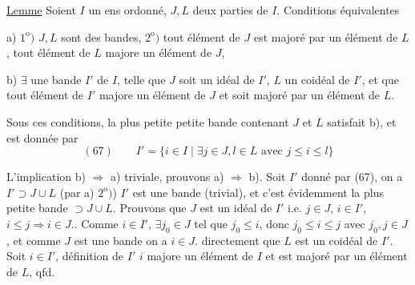 
\uline{Lemme} Soient $I$ un ens ordonné, $J,L$ deux parties de $I$. Conditions équivalentes

a) $1^{\mathrm o})$ $J,L$ sont des bandes, $2^{\mathrm o})$ tout élément de $J$ est majoré par un élément de $L$, tout élément de $L$ majore un élément de $J$, 

b) $\exists$ une bande $I'$ de $I$, telle que $J$ soit un idéal de $I'$, $L$ un coidéal de $I'$, et que tout élément de $I'$ majore un élément de $J$ et soit majoré par un élément de $L$.

Sous ces conditions,    la plus petite petite bande  contenant $J$ et $L$ satisfait b), et est donnée par
\[
(67)\qquad I'=\{i\in I\mid\exists j\in J,l\in L\text{ avec }j\leq i\leq l\}
\]

 L'implication b) $\Rightarrow$ a) triviale,  prouvons a) $\Rightarrow$ b). Soit $I'$ donné par (67), on a $I'\supset J\cup L$ (par a) $2^{\mathrm o})$) $I'$ est une bande (trivial), et c'est évidemment la plus petite bande $\supset J\cup L$. Prouvons que $J$ est un idéal de $I'$ i.e. $j\in J$, $i\in I'$, $i\leq j\Rightarrow i\in J$.. Comme $i\in I'$, $\exists j_0\in J$ tel que $j_0\leq i$, donc $j_0\leq i\leq j$ avec $j_0,j\in J$, et comme $J$ est une bande  on a $i\in J$.  directement que $L$ est un coidéal de $I'$. Soit $i\in I'$,  définition de $I'$ $i$ majore un élément de $I$ et est majoré par un élément de $L$, qfd.
